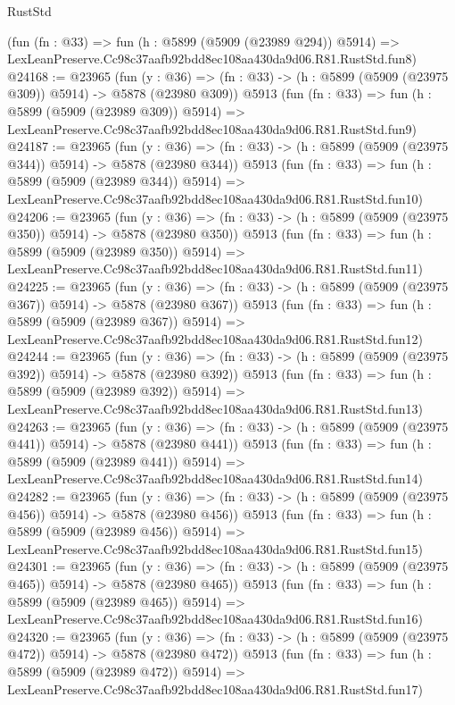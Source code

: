 \begin{lexlean}{RustStd}
\begin{coremodule}
{{    (fun (fn : @33) =>
    fun (h : @5899 (@5909 (@23989 @294)) @5914) =>
    LexLeanPreserve.Cc98c37aafb92bdd8ec108aa430da9d06.R81.RustStd.fun8)
@24168 := @23965
    (fun (y : @36) => (fn : @33) -> (h : @5899 (@5909 (@23975 @309)) @5914) -> @5878 (@23980 @309))
    @5913
    (fun (fn : @33) =>
    fun (h : @5899 (@5909 (@23989 @309)) @5914) =>
    LexLeanPreserve.Cc98c37aafb92bdd8ec108aa430da9d06.R81.RustStd.fun9)
@24187 := @23965
    (fun (y : @36) => (fn : @33) -> (h : @5899 (@5909 (@23975 @344)) @5914) -> @5878 (@23980 @344))
    @5913
    (fun (fn : @33) =>
    fun (h : @5899 (@5909 (@23989 @344)) @5914) =>
    LexLeanPreserve.Cc98c37aafb92bdd8ec108aa430da9d06.R81.RustStd.fun10)
@24206 := @23965
    (fun (y : @36) => (fn : @33) -> (h : @5899 (@5909 (@23975 @350)) @5914) -> @5878 (@23980 @350))
    @5913
    (fun (fn : @33) =>
    fun (h : @5899 (@5909 (@23989 @350)) @5914) =>
    LexLeanPreserve.Cc98c37aafb92bdd8ec108aa430da9d06.R81.RustStd.fun11)
@24225 := @23965
    (fun (y : @36) => (fn : @33) -> (h : @5899 (@5909 (@23975 @367)) @5914) -> @5878 (@23980 @367))
    @5913
    (fun (fn : @33) =>
    fun (h : @5899 (@5909 (@23989 @367)) @5914) =>
    LexLeanPreserve.Cc98c37aafb92bdd8ec108aa430da9d06.R81.RustStd.fun12)
@24244 := @23965
    (fun (y : @36) => (fn : @33) -> (h : @5899 (@5909 (@23975 @392)) @5914) -> @5878 (@23980 @392))
    @5913
    (fun (fn : @33) =>
    fun (h : @5899 (@5909 (@23989 @392)) @5914) =>
    LexLeanPreserve.Cc98c37aafb92bdd8ec108aa430da9d06.R81.RustStd.fun13)
@24263 := @23965
    (fun (y : @36) => (fn : @33) -> (h : @5899 (@5909 (@23975 @441)) @5914) -> @5878 (@23980 @441))
    @5913
    (fun (fn : @33) =>
    fun (h : @5899 (@5909 (@23989 @441)) @5914) =>
    LexLeanPreserve.Cc98c37aafb92bdd8ec108aa430da9d06.R81.RustStd.fun14)
@24282 := @23965
    (fun (y : @36) => (fn : @33) -> (h : @5899 (@5909 (@23975 @456)) @5914) -> @5878 (@23980 @456))
    @5913
    (fun (fn : @33) =>
    fun (h : @5899 (@5909 (@23989 @456)) @5914) =>
    LexLeanPreserve.Cc98c37aafb92bdd8ec108aa430da9d06.R81.RustStd.fun15)
@24301 := @23965
    (fun (y : @36) => (fn : @33) -> (h : @5899 (@5909 (@23975 @465)) @5914) -> @5878 (@23980 @465))
    @5913
    (fun (fn : @33) =>
    fun (h : @5899 (@5909 (@23989 @465)) @5914) =>
    LexLeanPreserve.Cc98c37aafb92bdd8ec108aa430da9d06.R81.RustStd.fun16)
@24320 := @23965
    (fun (y : @36) => (fn : @33) -> (h : @5899 (@5909 (@23975 @472)) @5914) -> @5878 (@23980 @472))
    @5913
    (fun (fn : @33) =>
    fun (h : @5899 (@5909 (@23989 @472)) @5914) =>
    LexLeanPreserve.Cc98c37aafb92bdd8ec108aa430da9d06.R81.RustStd.fun17)
}}
\end{coremodule}
\end{lexlean}
